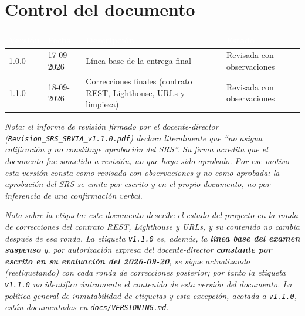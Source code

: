 \documentclass[11pt,a4paper]{article}
\begin{document}
\newpage
\tableofcontents
\newpage

\section*{Control del documento}

\begin{table}[h]
    \centering
    \renewcommand{\arraystretch}{1.5}
    \begin{tabularx}{\textwidth}{@{}|l|l|X|l|@{}}
        \hline
        \rowcolor{uteqblue}
        \textcolor{white}{\textbf{Versión}} & \textcolor{white}{\textbf{Fecha}} & \textcolor{white}{\textbf{Descripción}} & \textcolor{white}{\textbf{Estado}} \\ \hline
        1.0.0 & 17-09-2026 & Línea base de la entrega final & Revisada con observaciones \\ \hline
        1.1.0 & 18-09-2026 & Correcciones finales (contrato REST, Lighthouse, URLs y limpieza) & Revisada con observaciones \\ \hline
    \end{tabularx}
\end{table}

\vspace{0.3cm}
\textit{Nota: el informe de revisión firmado por el docente-director (\texttt{Revision\_SRS\_SBVIA\_v1.1.0.pdf}) declara literalmente que ``no asigna calificación y no constituye aprobación del SRS''. Su firma acredita que el documento fue sometido a revisión, no que haya sido aprobado. Por ese motivo esta versión consta como revisada con observaciones y no como aprobada: la aprobación del SRS se emite por escrito y en el propio documento, no por inferencia de una confirmación verbal.}

\vspace{0.3cm}
\textit{Nota sobre la etiqueta: este documento describe el estado del proyecto en la ronda de correcciones del contrato REST, Lighthouse y URLs, y su contenido no cambia después de esa ronda. La etiqueta \texttt{v1.1.0} es, además, la \textbf{línea base del examen suspenso} y, por autorización expresa del docente-director \textbf{constante por escrito en su evaluación del 2026-09-20}, se sigue actualizando (reetiquetando) con cada ronda de correcciones posterior; por tanto la etiqueta \texttt{v1.1.0} no identifica únicamente el contenido de esta versión del documento. La política general de inmutabilidad de etiquetas y esta excepción, acotada a \texttt{v1.1.0}, están documentadas en \texttt{docs/VERSIONING.md}.}
\end{document}
